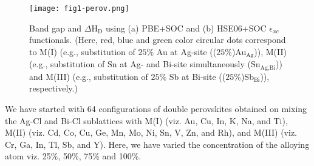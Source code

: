 \documentclass[journal=jpclcd,manuscript=letter]{achemso}
\begin{document}
\begin{figure}[H]
	\texttt{[image: fig1-perov.png]}
	\caption{Band gap and $\Delta$H$_{\textrm{D}}$ using (a) PBE+SOC and (b) HSE06+SOC $\epsilon_{xc}$ functionals. (Here, red, blue and green color circular dots correspond to M(I) (e.g., substitution of $25\%$ Au at Ag-site (($25\%$)Au$_{\textrm{Ag}}$)), M(II) (e.g., substitution of Sn at Ag- and Bi-site simultaneously (Sn$_{\textrm{Ag},\textrm{Bi}}$)) and M(III) (e.g., substitution of $25\%$ Sb at Bi-site (($25\%$)Sb$_{\textrm{Bi}}$)), respectively.)}
	\label{fig1}
\end{figure}
We have started with 64 configurations of double perovskites obtained on mixing the Ag-Cl and Bi-Cl sublattices with M(I) (viz. Au, Cu, In, K, Na, and Ti), M(II) (viz. Cd, Co, Cu, Ge, Mn, Mo, Ni, Sn, V, Zn, and Rh), and M(III) (viz. Cr, Ga, In, Tl, Sb, and Y). Here, we have varied the concentration of the alloying atom viz. 25\%, 50\%, 75\% and 100\%. 
\end{document}
